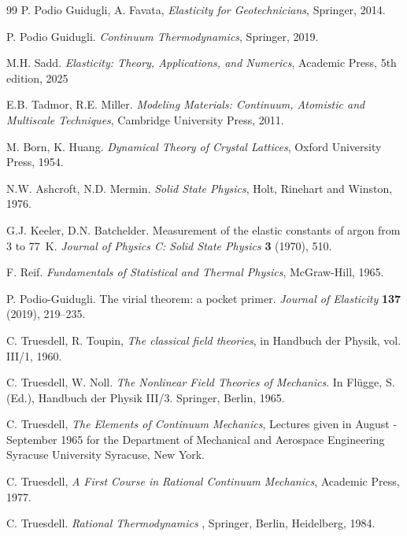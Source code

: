 \begin{thebibliography}{99}
P. Podio Guidugli, A. Favata, \textit{Elasticity for Geotechnicians}, Springer, 2014.

P. Podio Guidugli. \textit{Continuum Thermodynamics}, Springer, 2019.

 M.H. Sadd. \textit{Elasticity: Theory, Applications, and Numerics}, Academic Press, 5th edition, 2025

E.B. Tadmor, R.E. Miller. \textit{Modeling Materials: Continuum, Atomistic and Multiscale Techniques}, Cambridge University Press, 2011.

M. Born, K. Huang. \textit{Dynamical Theory of Crystal Lattices}, Oxford University Press, 1954.

N.W. Ashcroft, N.D. Mermin. \textit{Solid State Physics}, Holt, Rinehart and Winston, 1976.

G.J. Keeler, D.N. Batchelder. Measurement of the elastic constants of argon from 3 to 77~K. \textit{Journal of Physics C: Solid State Physics} \textbf{3} (1970), 510.

F. Reif. \textit{Fundamentals of Statistical and Thermal Physics}, McGraw-Hill, 1965.

P. Podio-Guidugli. The virial theorem: a pocket primer. \textit{Journal of Elasticity} \textbf{137} (2019), 219--235.

 C. Truesdell, R. Toupin, \textit{The classical field theories}, in Handbuch der Physik, vol. III/1, 1960.


C. Truesdell, W. Noll. \textit{The Nonlinear Field Theories of Mechanics}. In Fl\"{u}gge, S. (Ed.), Handbuch der Physik III/3. Springer, Berlin, 1965.

 C. Truesdell, \textit{The Elements of Continuum Mechanics}, Lectures given in August - September 1965 for the Department of Mechanical and Aerospace Engineering Syracuse University Syracuse, New York.

 C. Truesdell, \textit{A First Course in Rational Continuum Mechanics}, Academic Press, 1977.

C. Truesdell. \textit{Rational Thermodynamics },  Springer, Berlin, Heidelberg,  1984.





\end{thebibliography}

